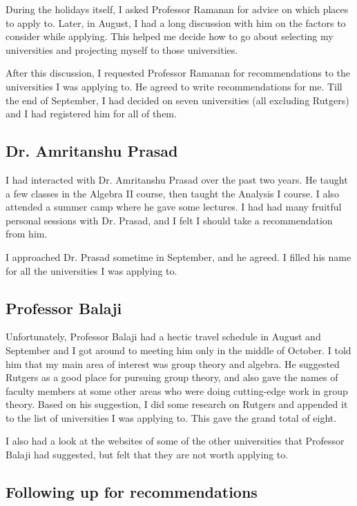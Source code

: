 \documentclass[a4paper]{amsart}
\begin{document}
During the holidays itself, I asked Professor Ramanan for advice on
which places to apply to. Later, in August, I had a long discussion with
him on the factors to consider while applying. This helped me decide
how to go about selecting my universities and projecting myself
to those universities.

After this discussion, I requested Professor Ramanan for recommendations
to the universities I was applying to. He agreed to write recommendations
for me. Till the end of September, I had decided on seven universities
(all excluding Rutgers) and I had registered him for all of them.

\subsection{Dr. Amritanshu Prasad}

I had interacted with Dr. Amritanshu Prasad over the past two years.
He taught a few classes in the Algebra II course, then taught the Analysis
I course. I also attended a summer camp where he gave some lectures.
I had had many fruitful personal sessions with Dr. Prasad, and I felt
I should take a recommendation from him.

I approached Dr. Prasad sometime in September, and he agreed. I filled his
name for all the universities I was applying to.
\subsection{Professor Balaji}

Unfortunately, Professor Balaji had a hectic travel schedule in August
and September and I got around to meeting him only in the middle of
October.  I told him that my main area of interest was group theory
and algebra.  He suggested Rutgers as a good place for pursuing group
theory, and also gave the names of faculty members at some other areas
who were doing cutting-edge work in group theory. Based on his
suggestion, I did some research on Rutgers and appended it to the list
of universities I was applying to. This gave the grand total of eight.

I also had a look at the websites of some of the other universities
that Professor Balaji had suggested, but felt that they are not worth
applying to.

\subsection{Following up for recommendations}
\end{document}
